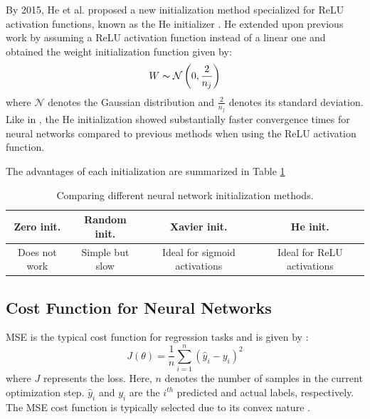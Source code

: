 By 2015, He et al. proposed a new initialization method specialized for ReLU activation functions, known as the He initializer \cite{he_init}. He extended upon previous work by assuming a ReLU activation function instead of a linear one and obtained the weight initialization function given by:
\begin{equation}
    W \thicksim \mathcal{N} \left(0, \frac{2}{n_j}  \right)
\end{equation}
where $\mathcal{N}$ denotes the Gaussian distribution and $\frac{2}{n_j}$ denotes its standard deviation.  Like in \cite{xavier_init}, the He initialization showed substantially faster convergence times for neural networks compared to previous methods when using the ReLU activation function.

The advantages of each initialization are summarized in Table \ref{tab:01nn_init}

\begin{table}[H]
\caption{Comparing different neural network initialization methods.}
\label{tab:01nn_init}
\centering
{\footnotesize
\begin{tabular}{c|c|c|c}
\textbf{Zero init.} & \textbf{Random init.}	& \textbf{Xavier init.} & \textbf{He init.}\\
\hline
Does not work	     	& Simple but slow			& Ideal for sigmoid activations &  Ideal for ReLU activations \\
\end{tabular}}
\end{table}




\subsection{Cost Function for Neural Networks}
MSE is the typical cost function for regression tasks and is given by \cite{NN}:
\begin{equation}
    J(\theta) = \frac{1}{n}\sum\limits^n_{i=1}(\hat{y}_i - y_i)^2
    \label{eq:08MSE}
\end{equation}
where $J$ represents the loss.  Here, $n$ denotes the number of samples in the current optimization step. $\hat{y}_i$ and $y_i$ are the $i^{th}$ predicted and actual labels, respectively. The MSE cost function is typically selected due to its convex nature \cite{deeplearning_course}.


